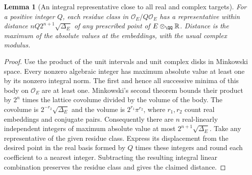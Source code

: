 \documentclass[a4paper,11pt]{article}
\newtheorem{lemma}[proposition]{Lemma}
\theoremstyle{definition}
\theoremstyle{remark}
\numberwithin{equation}{section}
\begin{document}
\begin{lemma}[An integral representative close to all real and complex targets]\leavevmode\label{lem:archlift342}
For a positive integer $Q$, each residue class in $\mathcal O_E/Q\mathcal O_E$
has a representative within distance $nQ2^{n+1}\sqrt{\Delta_E}$ of
any prescribed point of $E\otimes_\QQ\mathbb R$. Distance is the
maximum of the absolute values at the embeddings, with the usual
complex modulus.
\end{lemma}
\begin{proof}
Use the product of the unit intervals and unit complex disks in
Minkowski space. Every nonzero algebraic integer has maximum absolute
value at least one by its nonzero integral norm. The first and hence
all successive minima of this body on $\mathcal O_E$ are at least
one. Minkowski's second theorem bounds their product by $2^n$ times
the lattice covolume divided by the volume of the body. The covolume
is $2^{-r_2}\sqrt{\Delta_E}$ and the volume is $2^{r_1}\pi^{r_2}$,
where $r_1,r_2$ count real embeddings and conjugate pairs.
Consequently there are $n$ real-linearly independent integers of
maximum absolute value at most $2^{n+1}\sqrt{\Delta_E}$. Take any
representative of the given residue class. Express its displacement
from the desired point in the real basis formed by $Q$ times these
integers and round each coefficient to a nearest integer. Subtracting
the resulting integral linear combination preserves the residue
class and gives the claimed distance.
\end{proof}
\end{document}
